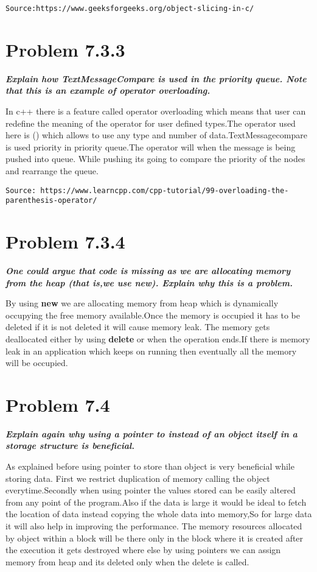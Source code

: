 \documentclass[a4paper,11pt]{article}
\theoremstyle{mytheor}
\begin{document}
\texttt{Source:https://www.geeksforgeeks.org/object-slicing-in-c/}

\section*{Problem 7.3.3}
\textbf{\textit{Explain how TextMessageCompare is used in the priority queue. Note that this is an example of operator overloading.}}

In c++ there is a feature called operator overloading which means that user can
redefine the meaning of the operator for user defined types.The operator used
here is () which allows to use any type and number of data.TextMessagecompare is
used priority in priority queue.The operator will when the message is being
pushed into queue. While pushing its going to compare the priority of the nodes
and rearrange the queue.

\texttt{Source: https://www.learncpp.com/cpp-tutorial/99-overloading-the-parenthesis-operator/}

\section*{Problem 7.3.4}
\textbf{\textit{One could argue that code is missing as we are allocating memory from the heap (that is,we use new). Explain why this is a problem.}}

By using \textbf{new} we are allocating memory from heap which is dynamically
occupying the free memory available.Once the memory is occupied it has to be
deleted if it is not deleted it will cause memory leak. The memory gets
deallocated either by using \textbf{delete} or when the operation ends.If there
is memory leak in an application which keeps on running then eventually all the
memory will be occupied.


\section*{Problem 7.4}

\textbf{\textit{Explain again why using a pointer to instead of an object itself in a storage structure is beneficial.}}

As explained before using pointer to store than object is very beneficial while
storing data. First we restrict duplication of memory calling the object
everytime.Secondly when using pointer the values stored can be easily altered
from any point of the program.Also if the data is large it would be ideal to
fetch the location of data instead copying the whole data into memory,So for
large data it will also help in improving the performance. The memory resources
allocated by object within a block will be there only in the block where it is
created  after the execution  it gets destroyed where else by using pointers we
can assign memory from heap and its deleted only when the delete is called.
\end{document}
